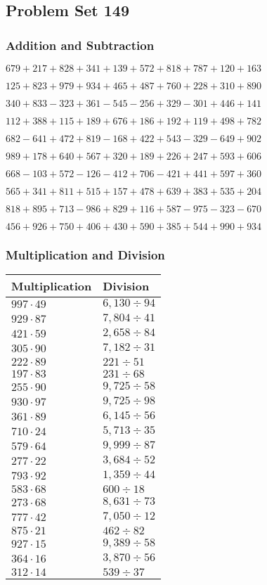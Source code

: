 \hypertarget{problem-set-149}{%
\subsection{Problem Set 149}\label{problem-set-149}}

\hypertarget{addition-and-subtraction}{%
\subsubsection{Addition and
Subtraction}\label{addition-and-subtraction}}

\(679 +217 +828 +341 +139 +572 +818 +787 +120 +163\)

\(125 +823 +979 +934 +465 +487 +760 +228 +310 +890\)

\(340 +833 - 323 +361 - 545 - 256 +329 - 301 +446 +141\)

\(112 +388 +115 +189 +676 +186 +192 +119 +498 +782\)

\(682 - 641 +472 +819 - 168 +422 +543 - 329 - 649 +902\)

\(989 +178 +640 +567 +320 +189 +226 +247 +593 +606\)

\(668 - 103 +572 - 126 - 412 +706 - 421 +441 +597 +360\)

\(565 +341 +811 +515 +157 +478 +639 +383 +535 +204\)

\(818 +895 +713 - 986 +829 +116 +587 - 975 - 323 - 670\)

\(456 +926 +750 +406 +430 +590 +385 +544 +990 +934\)

\hypertarget{multiplication-and-division}{%
\subsubsection{Multiplication and
Division}\label{multiplication-and-division}}

\begin{longtable}[]{@{}ll@{}}
\toprule
Multiplication & Division\tabularnewline
\midrule
\endhead
\(997 \cdot 49\) & \(6,130÷94\)\tabularnewline
\(929 \cdot 87\) & \(7,804÷41\)\tabularnewline
\(421 \cdot 59\) & \(2,658÷84\)\tabularnewline
\(305 \cdot 90\) & \(7,182÷31\)\tabularnewline
\(222 \cdot 89\) & \(221÷51\)\tabularnewline
\(197 \cdot 83\) & \(231÷68\)\tabularnewline
\(255 \cdot 90\) & \(9,725÷58\)\tabularnewline
\(930 \cdot 97\) & \(9,725÷98\)\tabularnewline
\(361 \cdot 89\) & \(6,145÷56\)\tabularnewline
\(710 \cdot 24\) & \(5,713÷35\)\tabularnewline
\(579 \cdot 64\) & \(9,999÷87\)\tabularnewline
\(277 \cdot 22\) & \(3,684÷52\)\tabularnewline
\(793 \cdot 92\) & \(1,359÷44\)\tabularnewline
\(583 \cdot 68\) & \(600÷18\)\tabularnewline
\(273 \cdot 68\) & \(8,631÷73\)\tabularnewline
\(777 \cdot 42\) & \(7,050÷12\)\tabularnewline
\(875 \cdot 21\) & \(462÷82\)\tabularnewline
\(927 \cdot 15\) & \(9,389÷58\)\tabularnewline
\(364 \cdot 16\) & \(3,870÷56\)\tabularnewline
\(312 \cdot 14\) & \(539÷37\)\tabularnewline
\bottomrule
\end{longtable}
